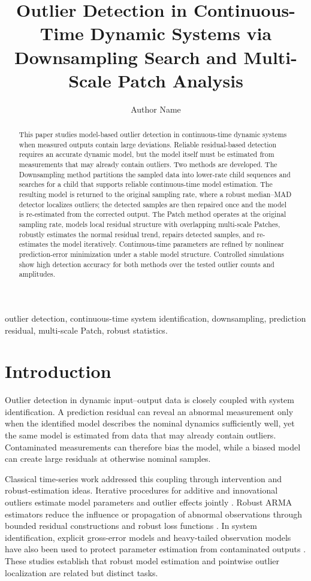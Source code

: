 \documentclass[journal]{IEEEtran}
\title{Outlier Detection in Continuous-Time Dynamic Systems via Downsampling Search and Multi-Scale Patch Analysis}
\author{Author Name}
\begin{document}
\maketitle

\begin{abstract}
This paper studies model-based outlier detection in continuous-time dynamic systems when measured outputs contain large deviations. Reliable residual-based detection requires an accurate dynamic model, but the model itself must be estimated from measurements that may already contain outliers. Two methods are developed. The Downsampling method partitions the sampled data into lower-rate child sequences and searches for a child that supports reliable continuous-time model estimation. The resulting model is returned to the original sampling rate, where a robust median--MAD detector localizes outliers; the detected samples are then repaired once and the model is re-estimated from the corrected output. The Patch method operates at the original sampling rate, models local residual structure with overlapping multi-scale Patches, robustly estimates the normal residual trend, repairs detected samples, and re-estimates the model iteratively. Continuous-time parameters are refined by nonlinear prediction-error minimization under a stable model structure. Controlled simulations show high detection accuracy for both methods over the tested outlier counts and amplitudes.
\end{abstract}

\begin{IEEEkeywords}
outlier detection, continuous-time system identification, downsampling, prediction residual, multi-scale Patch, robust statistics.
\end{IEEEkeywords}

\section{Introduction}
Outlier detection in dynamic input--output data is closely coupled with system identification. A prediction residual can reveal an abnormal measurement only when the identified model describes the nominal dynamics sufficiently well, yet the same model is estimated from data that may already contain outliers. Contaminated measurements can therefore bias the model, while a biased model can create large residuals at otherwise nominal samples.

Classical time-series work addressed this coupling through intervention and robust-estimation ideas. Iterative procedures for additive and innovational outliers estimate model parameters and outlier effects jointly \cite{chang1988,chen1993}. Robust ARMA estimators reduce the influence or propagation of abnormal observations through bounded residual constructions and robust loss functions \cite{bustos1986,muler2009,muma2017}. In system identification, explicit gross-error models and heavy-tailed observation models have also been used to protect parameter estimation from contaminated outputs \cite{xu2014,bottegal2014,bottegal2016}. These studies establish that robust model estimation and pointwise outlier localization are related but distinct tasks.
\end{document}
